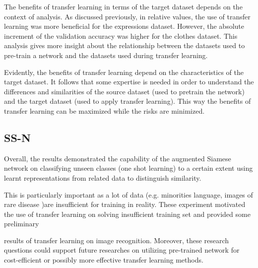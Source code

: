 \documentclass{article}
\begin{document}
The benefits of transfer learning in terms of the target dataset depends on the context of analysis. As discussed previously, in relative values, the use of transfer learning was more beneficial for the expressions dataset. However, the absolute increment of the validation accuracy was higher for the clothes dataset. This analysis gives more insight about the relationship between the datasets used to pre-train a network and the datasets used during transfer learning.     
 
Evidently, the benefits of transfer learning depend on the characteristics of the target dataset. It follows that some expertise is needed in order to understand the differences and similarities of the source dataset (used to pretrain the network) and the target dataset (used to apply transfer learning). This way the benefits of transfer learning can be maximized while the risks are minimized.

\subsection{SS-N}

Overall, the results demonstrated the capability of the augmented Siamese network on classifying unseen classes (one shot learning) to a certain extent using learnt representations from related data to distinguish similarity.

This is particularly important as a lot of data (e.g. minorities language, images of rare disease )are insufficient for training in reality. These experiment motivated the use of transfer learning on solving insufficient training set and provided some preliminary 

results of transfer learning on image recognition. Moreover, these research questions could support future researches on utilizing pre-trained network for cost-efficient or possibly more effective transfer learning methods.



\end{document}
